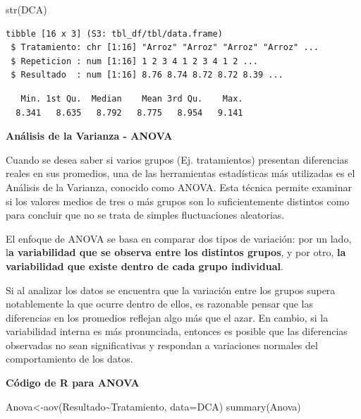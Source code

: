 \documentclass[
  letterpaper,
  DIV=11,
  numbers=noendperiod]{scrreprt}
\newenvironment{Shaded}{\begin{snugshade}}{\end{snugshade}}
\newcommand{\AttributeTok}[1]{\textcolor[rgb]{0.40,0.45,0.13}{#1}}
\newcommand{\FunctionTok}[1]{\textcolor[rgb]{0.28,0.35,0.67}{#1}}
\newcommand{\NormalTok}[1]{\textcolor[rgb]{0.00,0.23,0.31}{#1}}
\newcommand{\OtherTok}[1]{\textcolor[rgb]{0.00,0.23,0.31}{#1}}
\newcommand{\SpecialCharTok}[1]{\textcolor[rgb]{0.37,0.37,0.37}{#1}}
\begin{document}
\begin{Shaded}
\begin{Highlighting}[]
\FunctionTok{str}\NormalTok{(DCA)}
\end{Highlighting}
\end{Shaded}

\begin{verbatim}
tibble [16 x 3] (S3: tbl_df/tbl/data.frame)
 $ Tratamiento: chr [1:16] "Arroz" "Arroz" "Arroz" "Arroz" ...
 $ Repeticion : num [1:16] 1 2 3 4 1 2 3 4 1 2 ...
 $ Resultado  : num [1:16] 8.76 8.74 8.72 8.72 8.39 ...
\end{verbatim}

\begin{Shaded}
\end{Shaded}

\begin{verbatim}
   Min. 1st Qu.  Median    Mean 3rd Qu.    Max. 
  8.341   8.635   8.792   8.775   8.954   9.141 
\end{verbatim}

\textbf{Análisis de la Varianza - ANOVA}

Cuando se desea saber si varios grupos (Ej. tratamientos) presentan
diferencias reales en sus promedios, una de las herramientas
estadísticas más utilizadas es el Análisis de la Varianza, conocido como
ANOVA. Esta técnica permite examinar si los valores medios de tres o más
grupos son lo suficientemente distintos como para concluir que no se
trata de simples fluctuaciones aleatorias.

El enfoque de ANOVA se basa en comparar dos tipos de variación: por un
lado, l\textbf{a variabilidad que se observa entre los distintos
grupos}, y por otro, \textbf{la variabilidad que existe dentro de cada
grupo individual}.

Si al analizar los datos se encuentra que la variación entre los grupos
supera notablemente la que ocurre dentro de ellos, es razonable pensar
que las diferencias en los promedios reflejan algo más que el azar. En
cambio, si la variabilidad interna es más pronunciada, entonces es
posible que las diferencias observadas no sean significativas y
respondan a variaciones normales del comportamiento de los datos.

\textbf{Código de R para ANOVA}

\begin{Shaded}
\begin{Highlighting}[]
\NormalTok{Anova}\OtherTok{\textless{}{-}}\FunctionTok{aov}\NormalTok{(Resultado}\SpecialCharTok{\textasciitilde{}}\NormalTok{Tratamiento, }\AttributeTok{data=}\NormalTok{DCA)}
\FunctionTok{summary}\NormalTok{(Anova)}
\end{Highlighting}
\end{Shaded}
\end{document}
